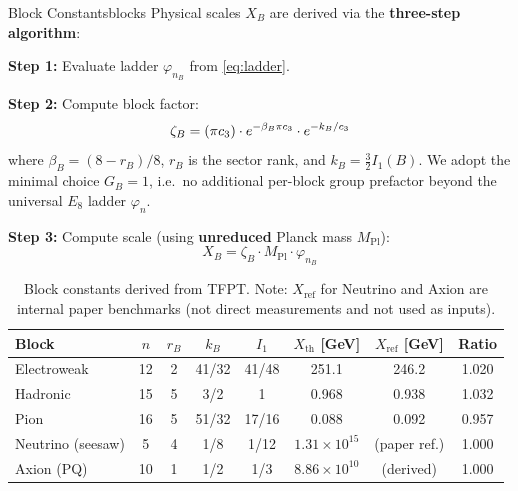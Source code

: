 \begin{definition}{Block Constants}{blocks}
Physical scales $X_B$ are derived via the \textbf{three-step algorithm}:

\textbf{Step 1:} Evaluate ladder $\varphi_{n_B}$ from \eqref{eq:ladder}.

\textbf{Step 2:} Compute block factor:
\begin{equation}
    \zeta_B = (\pi c_3) \cdot e^{-\beta_B\pi c_3} 
        \cdot e^{-k_B/c_3}
\end{equation}
where $\beta_B = (8 - r_B)/8$, $r_B$ is the sector rank, and $k_B = \frac{3}{2}I_1(B)$.
We adopt the minimal choice $G_B=1$, i.e.\ no additional per-block group prefactor beyond the universal $E_8$ ladder $\varphi_n$.

\textbf{Step 3:} Compute scale (using \textbf{unreduced} Planck mass $M_{\mathrm{Pl}}$):
\begin{equation}
    X_B = \zeta_B \cdot M_{\mathrm{Pl}} \cdot \varphi_{n_B}
\end{equation}
\end{definition}

\begin{table}[H]
\centering
\begin{tabular}{@{}lccccccc@{}}
\toprule
\textbf{Block} & $n$ & $r_B$ & $k_B$ & $I_1$ & $X_{\text{th}}$ [GeV] & 
    $X_{\text{ref}}$ [GeV] & \textbf{Ratio}\\
\midrule
Electroweak & 12 & 2 & 41/32 & 41/48 & 251.1 & 246.2 & 1.020\\
Hadronic & 15 & 5 & 3/2 & 1 & 0.968 & 0.938 & 1.032\\
Pion & 16 & 5 & 51/32 & 17/16 & 0.088 & 0.092 & 0.957\\
Neutrino (seesaw) & 5 & 4 & 1/8 & 1/12 & $1.31\times10^{15}$ & (paper ref.) & 1.000\\
Axion (PQ) & 10 & 1 & 1/2 & 1/3 & $8.86\times10^{10}$ & (derived) & 1.000\\
\bottomrule
\end{tabular}
\caption{Block constants derived from TFPT. Note: $X_{\text{ref}}$ for Neutrino 
and Axion are internal paper benchmarks (not direct measurements and not used as inputs).}
\label{tab:blocks}
\end{table}


